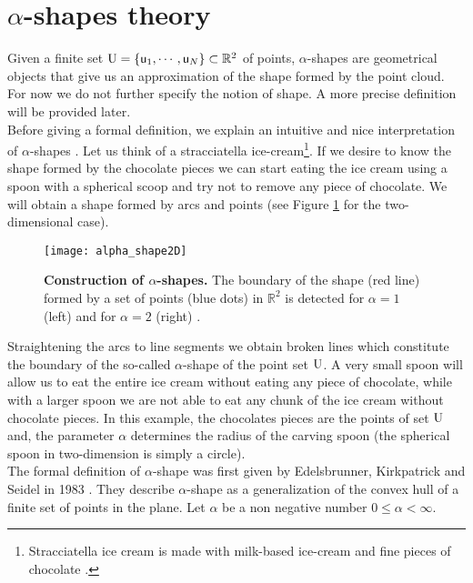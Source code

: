\section{$\alpha$-shapes theory}\label{sec:alpha-shapes}
Given a finite set $\mbox{$\textup{U}$} = \{\textsf{u}_1, \cdots, \textsf{u}_N\}\subset \mathbb{R}^2$ of points, $\alpha$-shapes are geometrical objects that give us an approximation of the shape formed by the point cloud. For now we do not further specify the notion of shape. A more precise definition will be provided later.\\ \indent
Before giving a formal definition, we explain an intuitive and nice interpretation of $\alpha$-shapes \cite{lucieer2004alpha}. 
Let us think of a stracciatella ice-cream\footnote{Stracciatella ice cream is made with milk-based ice-cream and fine pieces of chocolate \cite{Wiki3}.}. If we desire to know the shape formed by the chocolate pieces we can start eating the ice cream using a spoon with a spherical scoop and try not to remove any piece of chocolate. 
We will obtain a shape formed by arcs and points (see Figure \ref{fig:shape2d} for the two-dimensional case).
\begin{figure}[t]\label{fig:shape2d}
\begin{center} 
\texttt{[image: alpha\_shape2D]}
\label{fig:shape}
\caption{\textbf{Construction of $\alpha$-shapes.} The boundary of the shape (red line) formed by a set of points (blue dots) in $\mathbb{R}^2$ is detected for $\alpha = 1$ (left) and for $\alpha=2$ (right) \cite{sabel2017application}.}
\label{fig:shape2d}
\end{center}
\end{figure}
Straightening the arcs to line segments we obtain broken lines which constitute the boundary of the so-called $\alpha$-shape of the point set $\mbox{$\textup{U}$}$. 
A very small spoon will allow us to eat the entire ice cream without eating any piece of chocolate, while with a larger spoon we are not able to eat any chunk of the ice cream without chocolate pieces. In this example, the chocolates pieces are the points of set $\mbox{$\textup{U}$}$ and, the parameter $\alpha$ determines the radius of the carving spoon (the spherical spoon in two-dimension is simply a circle).\\ \indent 
The formal definition of $\alpha$-shape was first given by Edelsbrunner, Kirkpatrick and Seidel in 1983 \cite{edelsbrunner1983shape}. They describe $\alpha$-shape as a generalization of the convex hull of a finite set of points in the plane. Let $\alpha$ be a non negative number $0\leq\alpha<\infty$. 
